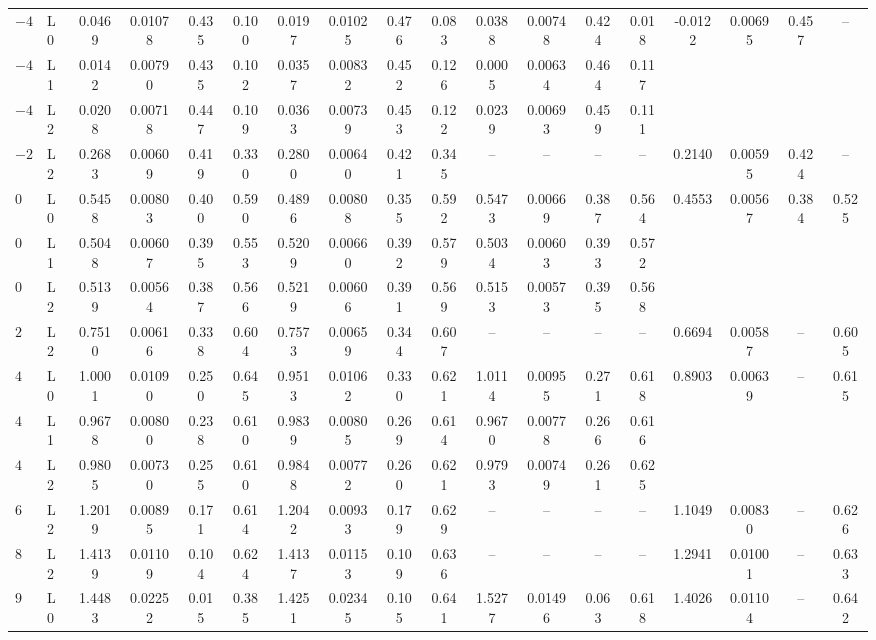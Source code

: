 \documentclass[conf]{new-aiaa}
\begin{document}
\begin{table}[!htbp]
\begin{tabular}{ll cccc cccc cccc cccc}
    \addlinespace
    $-4$ & L0 & 0.0469 & 0.01078 & 0.435 & 0.100 & 0.0197 & 0.01025 & 0.476 & 0.083 & 0.0388 & 0.00748 & 0.424 & 0.018 & -0.0122 & 0.00695 & 0.457 & -- \\
    $-4$ & L1 & 0.0142 & 0.00790 & 0.435 & 0.102 & 0.0357 & 0.00832 & 0.452 & 0.126 & 0.0005 & 0.00634 & 0.464 & 0.117 &  &  &  &  \\
    $-4$ & L2 & 0.0208 & 0.00718 & 0.447 & 0.109 & 0.0363 & 0.00739 & 0.453 & 0.122 & 0.0239 & 0.00693 & 0.459 & 0.111 &  &  &  &  \\
    \addlinespace
    $-2$ & L2 & 0.2683 & 0.00609 & 0.419 & 0.330 & 0.2800 & 0.00640 & 0.421 & 0.345 & -- & -- & -- & -- & 0.2140 & 0.00595 & 0.424 & -- \\
    \addlinespace
    $0$ & L0 & 0.5458 & 0.00803 & 0.400 & 0.590 & 0.4896 & 0.00808 & 0.355 & 0.592 & 0.5473 & 0.00669 & 0.387 & 0.564 & 0.4553 & 0.00567 & 0.384 & 0.525 \\
    $0$ & L1 & 0.5048 & 0.00607 & 0.395 & 0.553 & 0.5209 & 0.00660 & 0.392 & 0.579 & 0.5034 & 0.00603 & 0.393 & 0.572 &  &  &  &  \\
    $0$ & L2 & 0.5139 & 0.00564 & 0.387 & 0.566 & 0.5219 & 0.00606 & 0.391 & 0.569 & 0.5153 & 0.00573 & 0.395 & 0.568 &  &  &  &  \\
    \addlinespace
    $2$ & L2 & 0.7510 & 0.00616 & 0.338 & 0.604 & 0.7573 & 0.00659 & 0.344 & 0.607 & -- & -- & -- & -- & 0.6694 & 0.00587 & -- & 0.605 \\
    \addlinespace
    $4$ & L0 & 1.0001 & 0.01090 & 0.250 & 0.645 & 0.9513 & 0.01062 & 0.330 & 0.621 & 1.0114 & 0.00955 & 0.271 & 0.618 & 0.8903 & 0.00639 & -- & 0.615 \\
    $4$ & L1 & 0.9678 & 0.00800 & 0.238 & 0.610 & 0.9839 & 0.00805 & 0.269 & 0.614 & 0.9670 & 0.00778 & 0.266 & 0.616 &  &  &  &  \\
    $4$ & L2 & 0.9805 & 0.00730 & 0.255 & 0.610 & 0.9848 & 0.00772 & 0.260 & 0.621 & 0.9793 & 0.00749 & 0.261 & 0.625 &  &  &  &  \\
    \addlinespace
    $6$ & L2 & 1.2019 & 0.00895 & 0.171 & 0.614 & 1.2042 & 0.00933 & 0.179 & 0.629 & -- & -- & -- & -- & 1.1049 & 0.00830 & -- & 0.626 \\
    \addlinespace
    $8$ & L2 & 1.4139 & 0.01109 & 0.104 & 0.624 & 1.4137 & 0.01153 & 0.109 & 0.636 & -- & -- & -- & -- & 1.2941 & 0.01001 & -- & 0.633 \\
    \addlinespace
    $9$ & L0 & 1.4483 & 0.02252 & 0.015 & 0.385 & 1.4251 & 0.02345 & 0.105 & 0.641 & 1.5277 & 0.01496 & 0.063 & 0.618 & 1.4026 & 0.01104 & -- & 0.642 \\

\end{tabular}
\end{table}
\end{document}
